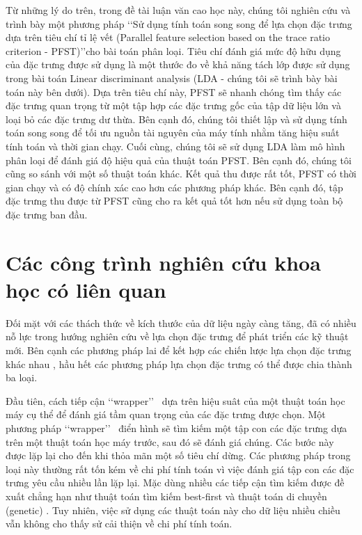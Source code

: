 Từ những lý do trên, trong đề tài luận văn cao học này, chúng tôi nghiên cứu và trình bày một phương pháp \lq\lq Sử dụng tính toán song song để lựa chọn đặc trưng dựa trên tiêu chí tỉ lệ vết (Parallel feature selection based on the trace ratio criterion - PFST)\rq\rq cho bài toán phân loại. Tiêu chí đánh giá mức độ hữu dụng của đặc trưng được sử dụng là một thước đo về khả năng tách lớp được sử dụng trong bài toán Linear discriminant analysis (LDA - chúng tôi sẽ trình bày bài toán này bên dưới). Dựa trên tiêu chí này, PFST sẽ nhanh chóng tìm thấy các đặc trưng quan trọng từ một tập hợp các đặc trưng gốc của tập dữ liệu lớn và loại bỏ các đặc trưng dư thừa. Bên cạnh đó, chúng tôi thiết lập và sử dụng tính toán song song để tối ưu nguồn tài nguyên của máy tính nhằm tăng hiệu suất tính toán và thời gian chạy. Cuối cùng, chúng tôi sẽ sử dụng LDA làm mô hình phân loại để đánh giá độ hiệu quả của thuật toán PFST. Bên cạnh đó, chúng tôi cũng so sánh với một số thuật toán khác. Kết quả thu được rất tốt, PFST có thời gian chạy và có độ chính xác cao hơn các phương pháp khác. Bên cạnh đó, tập đặc trưng thu được từ PFST cũng cho ra kết quả tốt hơn nếu sử dụng toàn bộ đặc trưng ban đầu.

\section{Các công trình nghiên cứu khoa học có liên quan}\label{section:relative_work}
Đối mặt với các thách thức về kích thước của dữ liệu ngày càng tăng, đã có nhiều nỗ lực trong hướng nghiên cứu về lựa chọn đặc trưng để phát triển các kỹ thuật mới. Bên cạnh các phương pháp lai để kết hợp các chiến lược lựa chọn đặc trưng khác nhau \cite{saeys2007review,ang2015supervised}, hầu hết các phương pháp lựa chọn đặc trưng có thể được chia thành ba loại.

Đầu tiên, cách tiếp cận \lq\lq wrapper\rq\rq~ dựa trên hiệu suât của một thuật toán học máy cụ thể để đánh giá tầm quan trọng của các đặc trưng được chọn. Một phương pháp \lq\lq wrapper\rq\rq~ điển hình sẽ tìm kiếm một tập con các đặc trưng dựa trên một thuật toán học máy trước, sau đó sẽ đánh giá chúng. Các bước này được lặp lại cho đến khi thỏa mãn một số tiêu chí dừng. Các phương pháp trong loại này thường rất tốn kém về chi phí tính toán vì việc đánh giá tập con các đặc trưng yêu cầu nhiều lần lặp lại. Mặc dùng nhiều các tiếp cận tìm kiếm được đề xuất chẳng hạn như thuật toán tìm kiếm best-first \cite{arai2016unsupervised} và thuật toán di chuyền (genetic) \cite{goldberg1988genetic}. Tuy nhiên, việc sử dụng các thuật toán này cho dữ liệu nhiều chiều vẫn không cho thấy sử cải thiện về chi phí tính toán.

